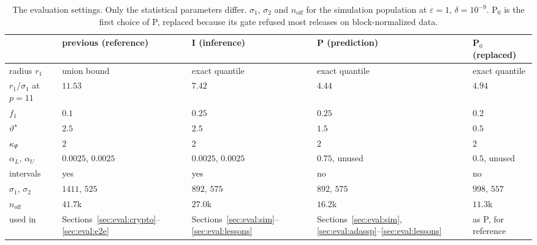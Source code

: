 \documentclass[11pt]{article}
\theoremstyle{definition}
\theoremstyle{plain}
\begin{document}
\begin{itemize}[noitemsep]
\end{itemize}

\begin{table}[ht]
\centering\small
\caption{The evaluation settings. Only the statistical parameters differ. $\sigma_1$, $\sigma_2$ and $n_{\mathrm{off}}$ for the simulation population at $\varepsilon = 1$, $\delta = 10^{-9}$. P$_0$ is the first choice of P, replaced because its gate refused most releases on block-normalized data.}
\label{tab:settings}
\setlength{\tabcolsep}{2.5pt}
\begin{tabular}{@{}lllll@{}}
\toprule
 & previous (reference) & I (inference) & P (prediction) & P$_0$ (replaced) \\
\midrule
radius $r_1$ & union bound & exact quantile & exact quantile & exact quantile \\
$r_1/\sigma_1$ at $p = 11$ & $11.53$ & $7.42$ & $4.44$ & $4.94$ \\
$f_1$ & $0.1$ & $0.25$ & $0.25$ & $0.2$ \\
$\vartheta^\star$ & $2.5$ & $2.5$ & $1.5$ & $0.5$ \\
$\kappa_\Psi$ & $2$ & $2$ & $2$ & $2$ \\
$\alpha_L$, $\alpha_U$ & $0.0025$, $0.0025$ & $0.0025$, $0.0025$ & $0.75$, unused & $0.5$, unused \\
intervals & yes & yes & no & no \\
$\sigma_1$, $\sigma_2$ & $1411$, $525$ & $892$, $575$ & $892$, $575$ & $998$, $557$ \\
$n_{\mathrm{off}}$ & $41.7$k & $27.0$k & $16.2$k & $11.3$k \\
used in & Sections~\ref{sec:eval:crypto}--\ref{sec:eval:e2e} & Sections~\ref{sec:eval:sim}--\ref{sec:eval:lessons} & Sections~\ref{sec:eval:sim}, \ref{sec:eval:adassp}--\ref{sec:eval:lessons} & as P, for reference \\
\bottomrule
\end{tabular}
\end{table}
\end{document}
